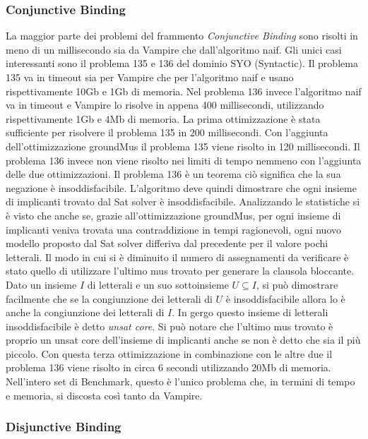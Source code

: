 \documentclass[./main.tex]{subfiles}
\begin{document}
\subsubsection{Conjunctive Binding}
La maggior parte dei problemi del frammento \textit{Conjunctive Binding} sono risolti in meno di un millisecondo sia da Vampire che dall'algoritmo naif.
Gli unici casi interessanti sono il problema 135 e 136 del dominio SYO (Syntactic).
Il problema 135 va in timeout sia per Vampire che per l'algoritmo naif e usano rispettivamente 10Gb e 1Gb di memoria.
Nel problema 136 invece l'algoritmo naif va in timeout e Vampire lo risolve in appena 400 millisecondi, 
utilizzando rispettivamente 1Gb e 4Mb di memoria.
La prima ottimizzazione è stata sufficiente per risolvere il problema 135 in 200 millisecondi.
Con l'aggiunta dell'ottimizzazione groundMus il problema 135 viene risolto in 120 millisecondi.
Il problema 136 invece non viene risolto nei limiti di tempo nemmeno con l'aggiunta delle due ottimizzazioni.
Il problema 136 è un teorema ciò significa che la sua negazione è insoddisfacibile.
L'algoritmo deve quindi dimostrare che ogni insieme di implicanti trovato dal Sat solver è insoddisfacibile.
Analizzando le statistiche si è visto che anche se, grazie all'ottimizzazione groundMus,
per ogni insieme di implicanti veniva trovata una contraddizione in tempi ragionevoli, 
ogni nuovo modello proposto dal Sat solver differiva dal precedente per il valore pochi letterali.
Il modo in cui si è diminuito il numero di assegnamenti da verificare è stato quello di utilizzare 
l'ultimo mus trovato per generare la clausola bloccante. 
Dato un insieme $I$ di letterali
e un suo sottoinsieme $U \subseteq I$, si può dimostrare facilmente che se la congiunzione dei letterali
di $U$ è insoddisfacibile allora lo è anche la congiunzione dei letterali di $I$.
In gergo questo insieme di letterali insoddisfacibile è detto \textit{unsat core}.
Si può notare che l'ultimo mus trovato è proprio un unsat core dell'insieme di implicanti anche se non è detto che sia il più piccolo.
Con questa terza ottimizzazione in combinazione con le altre due il problema 136 viene risolto in circa 6 secondi utilizzando 20Mb di memoria.
Nell'intero set di Benchmark, questo è l'unico problema che, 
in termini di tempo e memoria, si discosta così tanto da Vampire.


\subsubsection{Disjunctive Binding}
\end{document}
